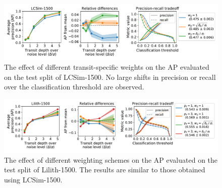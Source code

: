 \begin{figure}
    \centering
    \includegraphics[width=0.9\linewidth]{Experiments/Figures/Models/lcsim1500_AP_weighting-w.pdf}
    \caption{The effect of different transit-specific weights on the AP evaluated on the test split of LCSim-1500. No large shifts in precision or recall over the classification threshold are observed. }
    \label{fig:lcsim_weight_w}
\end{figure}

\begin{figure}
    \centering
    \includegraphics[width=0.95\linewidth]{Experiments/Figures/Models/lilith1500_AP_weighting.pdf}
    \caption{The effect of different weighting schemes on the AP evaluated on the test split of Lilith-1500. The results are similar to those obtained using LCSim-1500.}
    \label{fig:lilith_weighting}
\end{figure}
